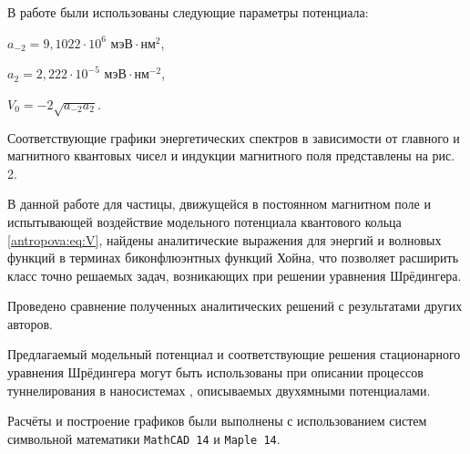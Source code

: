 В работе \cite{antropova:bib:TanInkson1996} были использованы следующие параметры потенциала:

$a_{-2} = 9,1022\cdot 10^6\text{ мэВ}\cdot\text{нм}^2$, 

$a_2 = 2,222\cdot 10^{-5}\text{ мэВ}\cdot\text{нм}^{-2}$, 

$V_0 = -2\sqrt{a_{-2}a_2}$.





Соответствующие графики энергетических спектров в зависимости от главного и магнитного квантовых чисел и индукции магнитного поля представлены на рис. 2.





\smallskip






В данной работе для частицы, движущейся в постоянном магнитном поле и испытывающей воздействие модельного потенциала квантового кольца \eqref{antropova:eq:V}, найдены аналитические выражения для энергий и волновых функций в терминах биконфлюэнтных функций  Хойна, что позволяет расширить  класс точно решаемых задач, возникающих при решении уравнения Шрёдингера.



Проведено сравнение полученных аналитических решений с результатами других авторов.



Предлагаемый модельный потенциал и соответствующие решения стационарного уравнения Шрёдингера могут быть использованы при описании процессов туннелирования в наносистемах \cite{antropova:bib:BK2010}, описываемых двухямными потенциалами.



Расчёты и построение графиков были выполнены с использованием систем символьной математики {\tt MathCAD 14} и {\tt Maple 14}.









